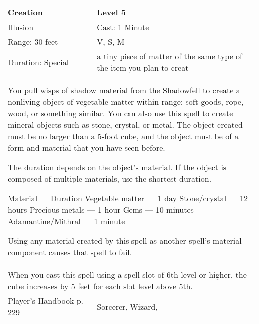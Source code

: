 \documentclass[11pt]{report}
\begin{document}
\begin{table}[H]
	\begin{tabular}{||p{6cm}|p{6cm}||}
		\hline\hline
		\bf{Creation} & Level 5\\ \hline
		Illusion & Cast: 1 Minute\\ \hline
		Range: 30 feet & V, S, M \\ \hline
		Duration: Special & a tiny piece of matter of the same type of the item you plan to creat\\ \hline
		\multicolumn{2}{||p{12cm}||}{You pull wisps of shadow material from the Shadowfell to create a nonliving object of vegetable matter within range: soft goods, rope, wood, or something similar. You can also use this spell to create mineral objects such as stone, crystal, or metal. The object created must be no larger than a 5-foot cube, and the object must be of a form and material that you have seen before. 

The duration depends on the object’s material. If the object is composed of multiple materials, use the shortest duration. 

Material — Duration 
Vegetable matter — 1 day 
Stone/crystal — 12 hours 
Precious metals — 1 hour 
Gems — 10 minutes 
Adamantine/Mithral — 1 minute 

Using any material created by this spell as another spell’s material component causes that spell to fail.}\\ \hline
		\multicolumn{2}{||p{12cm}||}{When you cast this spell using a spell slot of 6th level or higher, the cube increases by 5 feet for each slot level above 5th.}\\ \hline
Player's Handbook p. 229 & Sorcerer, Wizard, \\ \hline\hline
	\end{tabular}
\end{table}
\end{document}
